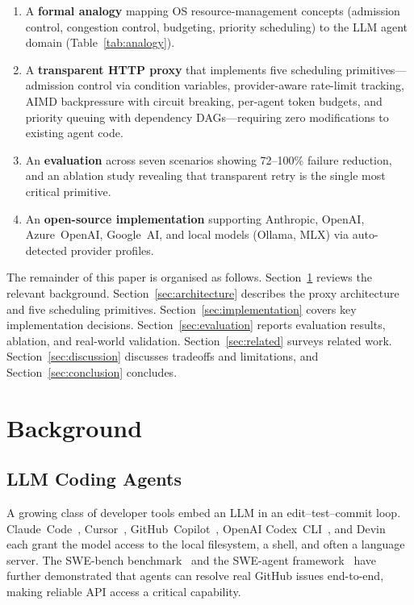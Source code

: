 \documentclass[11pt,twocolumn]{article}
\begin{document}
\begin{enumerate}[nosep]
  \item A \textbf{formal analogy} mapping OS resource-management
    concepts (admission control, congestion control, budgeting,
    priority scheduling) to the LLM agent domain
    (Table~\ref{tab:analogy}).
  \item A \textbf{transparent HTTP proxy} that implements five
    scheduling primitives---admission control via condition
    variables, provider-aware rate-limit tracking, AIMD
    backpressure with circuit breaking, per-agent token budgets,
    and priority queuing with dependency DAGs---requiring zero
    modifications to existing agent code.
  \item An \textbf{evaluation} across seven scenarios showing
    72--100\% failure reduction, and an ablation study revealing
    that transparent retry is the single most critical primitive.
  \item An \textbf{open-source implementation} supporting
    Anthropic, OpenAI, Azure~OpenAI, Google~AI, and local models
    (Ollama, MLX) via auto-detected provider profiles.
\end{enumerate}

The remainder of this paper is organised as follows.
Section~\ref{sec:background} reviews the relevant background.
Section~\ref{sec:architecture} describes the proxy architecture
and five scheduling primitives.
Section~\ref{sec:implementation} covers key implementation
decisions.
Section~\ref{sec:evaluation} reports evaluation results,
ablation, and real-world validation.
Section~\ref{sec:related} surveys related work.
Section~\ref{sec:discussion} discusses tradeoffs and limitations,
and Section~\ref{sec:conclusion} concludes.

\section{Background}
\label{sec:background}

\subsection{LLM Coding Agents}

A growing class of developer tools embed an LLM in an
edit--test--commit loop.  Claude~Code~\cite{claudecode2025},
Cursor~\cite{cursor2024}, GitHub~Copilot~\cite{copilot2024},
OpenAI Codex~CLI~\cite{codex2025}, and
Devin~\cite{devin2024} each grant the model access to the
local filesystem, a shell, and often a language server.  The
SWE-bench benchmark~\cite{jimenez2024swebench} and the
SWE-agent framework~\cite{yang2024sweagent} have further
demonstrated that agents can resolve real GitHub issues
end-to-end, making reliable API access a critical capability.
\end{document}
